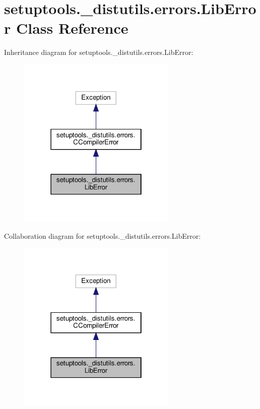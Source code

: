 \hypertarget{classsetuptools_1_1__distutils_1_1errors_1_1LibError}{}\section{setuptools.\+\_\+distutils.\+errors.\+Lib\+Error Class Reference}
\label{classsetuptools_1_1__distutils_1_1errors_1_1LibError}


Inheritance diagram for setuptools.\+\_\+distutils.\+errors.\+Lib\+Error\+:
\nopagebreak
\begin{figure}[H]
\begin{center}
\leavevmode
\includegraphics[width=214pt]{classsetuptools_1_1__distutils_1_1errors_1_1LibError__inherit__graph}
\end{center}
\end{figure}


Collaboration diagram for setuptools.\+\_\+distutils.\+errors.\+Lib\+Error\+:
\nopagebreak
\begin{figure}[H]
\begin{center}
\leavevmode
\includegraphics[width=214pt]{classsetuptools_1_1__distutils_1_1errors_1_1LibError__coll__graph}
\end{center}
\end{figure}


